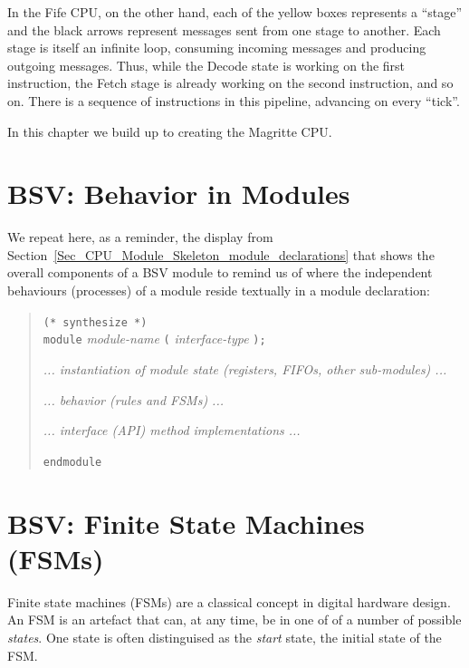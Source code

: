 In the Fife CPU, on the other hand, each of the yellow boxes
represents a ``stage'' and the black arrows represent messages sent
from one stage to another.  Each stage is itself an infinite loop,
consuming incoming messages and producing outgoing messages.  Thus,
while the Decode state is working on the first instruction, the Fetch
stage is already working on the second instruction, and so on.  There
is a sequence of instructions in this pipeline, advancing on every
``tick''.

In this chapter we build up to creating the Magritte CPU.


\section{BSV: Behavior in Modules}

\label{Sec_FSMs_Behavior}


We repeat here, as a reminder, the display from
Section~\ref{Sec_CPU_Module_Skeleton_module_declarations} that shows
the overall components of a BSV module to remind us of where the
independent behaviours (processes) of a module reside textually in a
module declaration:

\begin{quote}
{\tt (* synthesize *)} \\
{\tt module} \emph{module-name} {\tt (} \emph{interface-type} {\tt );}

\hmm \emph{... instantiation of module state (registers, FIFOs, other sub-modules) ...}

\hmm \emph{... behavior (rules and FSMs) ...}

\hmm \emph{... interface (API) method implementations ...}

{\tt endmodule}
\end{quote}


\section{BSV: Finite State Machines (FSMs)}

\label{Sec_FSMs_FSMs}


Finite state machines (FSMs) are a classical concept in digital
hardware design.  An FSM is an artefact that can, at any time, be in
one of of a number of possible \emph{states}.  One state is often
distinguised as the \emph{start} state, the initial state of the FSM.

